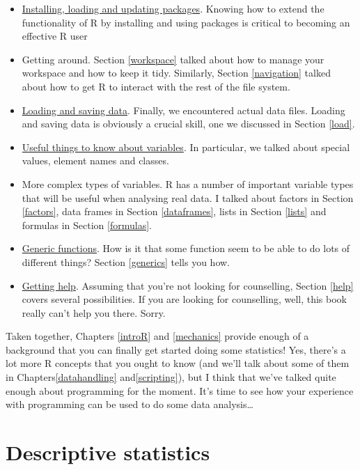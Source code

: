\documentclass[
]{book}
\providecommand{\tightlist}{%
  \setlength{\itemsep}{0pt}\setlength{\parskip}{0pt}}
\begin{document}
\begin{itemize}
\tightlist
\item
  \protect\hyperlink{packageinstall}{Installing, loading and updating packages}. Knowing how to extend the functionality of R by installing and using packages is critical to becoming an effective R user
\item
  Getting around. Section \ref{workspace} talked about how to manage your workspace and how to keep it tidy. Similarly, Section \ref{navigation} talked about how to get R to interact with the rest of the file system.
\item
  \protect\hyperlink{load}{Loading and saving data}. Finally, we encountered actual data files. Loading and saving data is obviously a crucial skill, one we discussed in Section \ref{load}.
\item
  \protect\hyperlink{useful}{Useful things to know about variables}. In particular, we talked about special values, element names and classes.
\item
  More complex types of variables. R has a number of important variable types that will be useful when analysing real data. I talked about factors in Section \ref{factors}, data frames in Section \ref{dataframes}, lists in Section \ref{lists} and formulas in Section \ref{formulas}.
\item
  \protect\hyperlink{generics}{Generic functions}. How is it that some function seem to be able to do lots of different things? Section \ref{generics} tells you how.
\item
  \protect\hyperlink{help}{Getting help}. Assuming that you're not looking for counselling, Section \ref{help} covers several possibilities. If you are looking for counselling, well, this book really can't help you there. Sorry.
\end{itemize}

Taken together, Chapters \ref{introR} and \ref{mechanics} provide enough of a background that you can finally get started doing some statistics! Yes, there's a lot more R concepts that you ought to know (and we'll talk about some of them in Chapters\ref{datahandling} and\ref{scripting}), but I think that we've talked quite enough about programming for the moment. It's time to see how your experience with programming can be used to do some data analysis\ldots{}

\hypertarget{descriptives}{%
\chapter{Descriptive statistics}\label{descriptives}}
\end{document}
